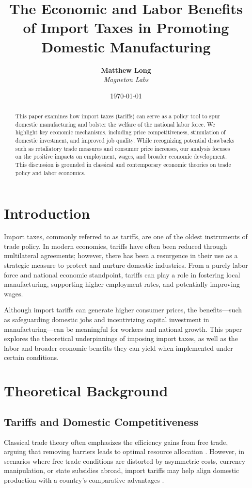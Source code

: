 \documentclass[12pt]{article}
\title{The Economic and Labor Benefits of Import Taxes in Promoting Domestic Manufacturing}
\author{
  \textbf{Matthew Long}\\
  \textit{Magneton Labs}
}
\date{\today}
\begin{document}
\maketitle

\begin{abstract}
This paper examines how import taxes (tariffs) can serve as a policy tool to spur domestic manufacturing and bolster the welfare of the national labor force. We highlight key economic mechanisms, including price competitiveness, stimulation of domestic investment, and improved job quality. While recognizing potential drawbacks such as retaliatory trade measures and consumer price increases, our analysis focuses on the positive impacts on employment, wages, and broader economic development. This discussion is grounded in classical and contemporary economic theories on trade policy and labor economics.
\end{abstract}

\section{Introduction}
Import taxes, commonly referred to as tariffs, are one of the oldest instruments of trade policy. In modern economies, tariffs have often been reduced through multilateral agreements; however, there has been a resurgence in their use as a strategic measure to protect and nurture domestic industries. From a purely labor force and national economic standpoint, tariffs can play a role in fostering local manufacturing, supporting higher employment rates, and potentially improving wages. 

Although import tariffs can generate higher consumer prices, the benefits---such as safeguarding domestic jobs and incentivizing capital investment in manufacturing---can be meaningful for workers and national growth. This paper explores the theoretical underpinnings of imposing import taxes, as well as the labor and broader economic benefits they can yield when implemented under certain conditions.

\section{Theoretical Background}

\subsection{Tariffs and Domestic Competitiveness}
Classical trade theory often emphasizes the efficiency gains from free trade, arguing that removing barriers leads to optimal resource allocation \citep{krugman1987}. However, in scenarios where free trade conditions are distorted by asymmetric costs, currency manipulation, or state subsidies abroad, import tariffs may help align domestic production with a country's comparative advantages \citep{bhagwati1988}. 
\end{document}
